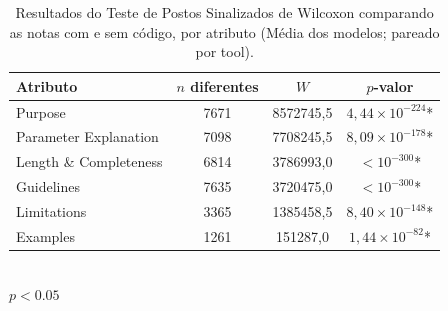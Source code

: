 \begin{table}[H]
\centering
\caption{Resultados do Teste de Postos Sinalizados de Wilcoxon comparando as notas com e sem código, por atributo (Média dos modelos; pareado por tool).}
\label{tab:wilcoxon_media}
\begin{tabular}{lccc}
\toprule
Atributo & $n$ diferentes & $W$ & $p$-valor \\
\midrule
Purpose & 7671 & 8572745,5 & $4,44 \times 10^{-224}$* \\
Parameter Explanation & 7098 & 7708245,5 & $8,09 \times 10^{-178}$* \\
Length \& Completeness & 6814 & 3786993,0 & $< 10^{-300}$* \\
Guidelines & 7635 & 3720475,0 & $< 10^{-300}$* \\
Limitations & 3365 & 1385458,5 & $8,40 \times 10^{-148}$* \\
Examples & 1261 & 151287,0 & $1,44 \times 10^{-82}$* \\
\bottomrule
\end{tabular}
\\[4pt]
{\footnotesize * $p<0.05$}
\end{table}
